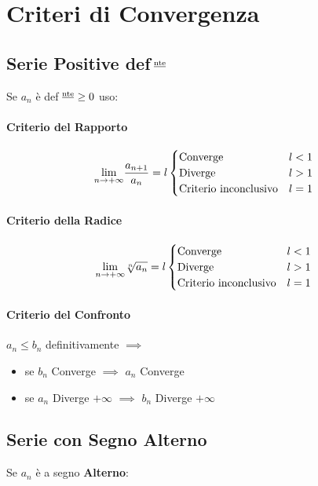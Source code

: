 \documentclass[12pt, a4paper, openany]{book}
\begin{document}
\section{Criteri di Convergenza}


\subsection*{Serie Positive def$^{\text{ \underline{nte}}}$}
Se $a_n$ è def$^{\text{ \underline{nte}}} \geq 0$ uso:
\paragraph*{Criterio del Rapporto} 
\[
	\underset{n \to +\infty}{\lim} \frac{a_{n+1}}{a_n} = l
	\begin{cases}
		\text{Converge} &  l<1\\
		\text{Diverge} & l>1\\
		\text{Criterio inconclusivo} & l=1
	\end{cases}
\]

\paragraph*{Criterio della Radice} 
\[
	\underset{n \to +\infty}{\lim} \sqrt[n]{a_n} = l
	\begin{cases}
		\text{Converge} &  l<1\\
		\text{Diverge} & l>1\\
		\text{Criterio inconclusivo} & l=1
	\end{cases}
\]

\paragraph*{Criterio del Confronto}
$a_n\leq b_n$ definitivamente $\implies$
\begin{itemize}
	\item se $b_n$ Converge $\implies$  $a_n$ Converge
	\item se $a_n$ Diverge $+\infty$ $\implies$ $b_n$ Diverge $+\infty$
\end{itemize}

\subsection*{Serie con Segno Alterno}
Se $a_n$ è a segno \textbf{Alterno}: 
\end{document}
